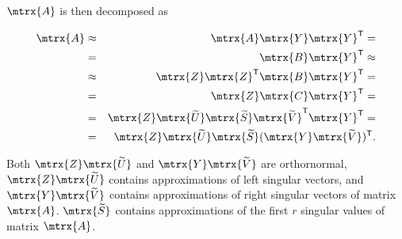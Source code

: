 $\mtrx{A}$ is then decomposed as

\begin{eqnarray}
\mtrx{A} &\approx& \mtrx{A}\mtrx{Y}\mtrx{Y}^{\mathsf{T}} =
\\
&=& \mtrx{B}\mtrx{Y}^{\mathsf{T}} \approx \nonumber
\\
&\approx& \mtrx{Z}\mtrx{Z}^{\mathsf{T}}\mtrx{B}\mtrx{Y}^{\mathsf{T}} = \nonumber
\\
&=& \mtrx{Z}\mtrx{C}\mtrx{Y}^{\mathsf{T}} = \nonumber
\\
&=& \mtrx{Z}\mtrx{\widetilde{U}} \mtrx{\widetilde{S}} \mtrx{\widetilde{V}}^{\mathsf{T}}\mtrx{Y}^{\mathsf{T}} = \nonumber
\\
&=& \mtrx{Z}\mtrx{\widetilde{U}} \mtrx{\widetilde{S}} (\mtrx{Y}\mtrx{\widetilde{V}})^{\mathsf{T}}. \nonumber
\label{eq:redsvd}
\end{eqnarray}

\noindent
Both $\mtrx{Z}\mtrx{\widetilde{U}}$ and $\mtrx{Y}\mtrx{\widetilde{V}}$ are orthornormal, $\mtrx{Z}\mtrx{\widetilde{U}}$ contains approximations of left singular vectors, and $\mtrx{Y}\mtrx{\widetilde{V}}$ contains approximations of right singular vectors of matrix $\mtrx{A}$. $\mtrx{\widetilde{S}}$ contains approximations of the first $r$ singular values of matrix $\mtrx{A}$.

